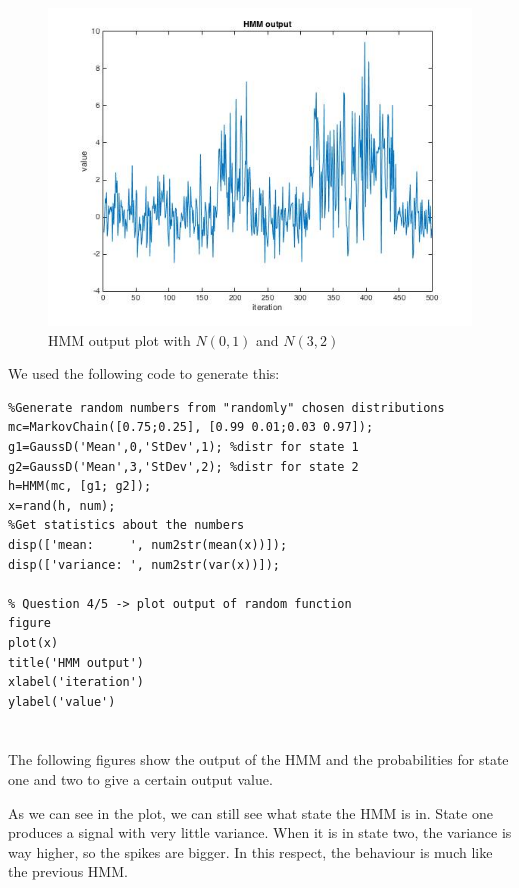 \begin{figure}[H]
	\caption{HMM output plot with $N(0,1)$ and $N(3,2)$}
	\label{fig:question_4_HMM_plot}
	\centering
	\includegraphics[width=14cm]{images/question_4_HMM_plot}
\end{figure}

We used the following code to generate this:

\begin{verbatim}
%Generate random numbers from "randomly" chosen distributions
mc=MarkovChain([0.75;0.25], [0.99 0.01;0.03 0.97]);
g1=GaussD('Mean',0,'StDev',1); %distr for state 1
g2=GaussD('Mean',3,'StDev',2); %distr for state 2
h=HMM(mc, [g1; g2]);
x=rand(h, num);
%Get statistics about the numbers
disp(['mean:     ', num2str(mean(x))]);
disp(['variance: ', num2str(var(x))]);

% Question 4/5 -> plot output of random function
figure
plot(x)
title('HMM output')
xlabel('iteration')
ylabel('value')
\end{verbatim}

\section{} %
The following figures show the output of the HMM and the probabilities for state one and two to give a certain output value.

As we can see in the plot, we can still see what state the HMM is in. State one produces a signal with very little variance. When it is in state two, the variance is way higher, so the spikes are bigger. In this respect, the behaviour is much like the previous HMM.

